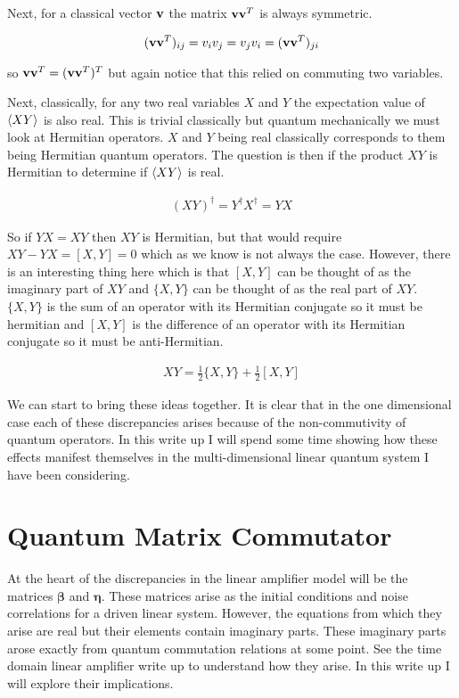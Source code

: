 \documentclass[12pt]{article}
\newcommand{\bv}[1]{\bold{#1}}
\newcommand{\bvs}[1]{\boldsymbol{#1}}
\begin{document}
Next, for a classical vector $\bv{v}$ the matrix $\bv{v}\bv{v}^T$ is always symmetric.

\begin{align}
(\bv{v}\bv{v}^T)_{ij} = v_i v_j = v_j v_i = (\bv{v}\bv{v}^T)_{ji}
\end{align}

so $\bv{v} \bv{v}^T = (\bv{v}\bv{v}^T)^T$ but again notice that this relied on commuting two variables.

Next, classically, for any two real variables $X$ and $Y$ the expectation value of $\braket{XY}$ is also real. This is trivial classically but quantum mechanically we must look at Hermitian operators. $X$ and $Y$ being real classically corresponds to them being Hermitian quantum operators. The question is then if the product $XY$ is Hermitian to determine if $\braket{XY}$ is real.

\begin{align}
(XY)^{\dag} = Y^{\dag}X^{\dag} = YX
\end{align}

So if $YX = XY$ then $XY$ is Hermitian, but that would require $XY-YX = [X,Y] = 0$ which as we know is not always the case. However, there is an interesting thing here which is that $[X,Y]$ can be thought of as the imaginary part of $XY$ and $\{X,Y\}$ can be thought of as the real part of $XY$. $\{X,Y\}$ is the sum of an operator with its Hermitian conjugate so it must be hermitian and $[X,Y]$ is the difference of an operator with its Hermitian conjugate so it must be anti-Hermitian.

\begin{align}
XY = \frac{1}{2}\{X,Y\} + \frac{1}{2}[X,Y]
\end{align}

We can start to bring these ideas together. It is clear that in the one dimensional case each of these discrepancies arises because of the non-commutivity of quantum operators. In this write up I will spend some time showing how these effects manifest themselves in the multi-dimensional linear quantum system I have been considering.

\section{Quantum Matrix Commutator}

At the heart of the discrepancies in the linear amplifier model will be the matrices $\bvs{\beta}$ and $\bvs{\eta}$. These matrices arise as the initial conditions and noise correlations for a driven linear system. However, the equations from which they arise are real but their elements contain imaginary parts. These imaginary parts arose exactly from quantum commutation relations at some point. See the time domain linear amplifier write up to understand how they arise. In this write up I will explore their implications.
\end{document}
